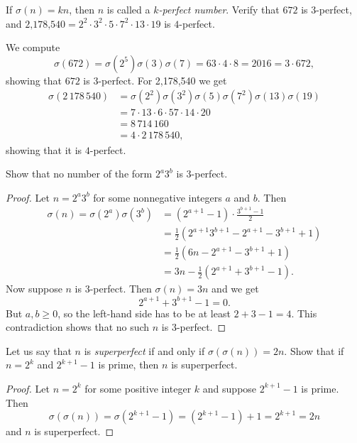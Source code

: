  If $\sigma(n) = kn$, then $n$ is called a {\em $k$-perfect
  number}. Verify that $672$ is $3$-perfect, and
$\text{2,178,540} = 2^2\cdot3^2\cdot5\cdot7^2\cdot13\cdot19$ is
$4$-perfect.
\begin{solution}
  We compute
  \begin{equation*}
    \sigma(672) = \sigma(2^5)\sigma(3)\sigma(7)
    = 63\cdot4\cdot8
    = 2016 = 3\cdot672,
  \end{equation*}
  showing that $672$ is $3$-perfect. For 2,178,540 we get
  \begin{align*}
    \sigma(2\,178\,540)
    &= \sigma(2^2)\sigma(3^2)\sigma(5)\sigma(7^2)\sigma(13)\sigma(19) \\
    &= 7\cdot13\cdot6\cdot57\cdot14\cdot20 \\
    &= 8\,714\,160 \\
    &= 4\cdot2\,178\,540,
  \end{align*}
  showing that it is $4$-perfect.
\end{solution}

 Show that no number of the form $2^a3^b$ is $3$-perfect.
\begin{proof}
  Let $n = 2^a3^b$ for some nonnegative integers $a$ and $b$. Then
  \begin{align*}
    \sigma(n) = \sigma(2^a)\sigma(3^b)
    &= (2^{a+1} - 1)\cdot\frac{3^{b+1} - 1}2 \\
    &= \frac12(2^{a+1}3^{b+1} - 2^{a+1} - 3^{b+1} + 1) \\
    &= \frac12(6n - 2^{a+1} - 3^{b+1} + 1) \\
    &= 3n - \frac12(2^{a+1} + 3^{b+1} - 1).
  \end{align*}
  Now suppose $n$ is $3$-perfect. Then $\sigma(n) = 3n$ and we get
  \begin{equation*}
    2^{a+1} + 3^{b+1} - 1 = 0.
  \end{equation*}
  But $a,b\geq0$, so the left-hand side has to be at least
  $2 + 3 - 1 = 4$. This contradiction shows that no such $n$ is
  $3$-perfect.
\end{proof}

 Let us say that $n$ is {\em superperfect}\/ if and only if
$\sigma(\sigma(n)) = 2n$. Show that if $n = 2^k$ and $2^{k+1} - 1$ is
prime, then $n$ is superperfect.
\begin{proof}
  Let $n = 2^k$ for some positive integer $k$ and suppose
  $2^{k+1} - 1$ is prime. Then
  \begin{equation*}
    \sigma(\sigma(n)) = \sigma(2^{k+1} - 1) = (2^{k+1} - 1) + 1
    = 2^{k+1} = 2n
  \end{equation*}
  and $n$ is superperfect.
\end{proof}

